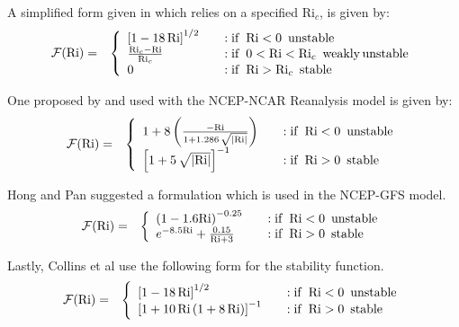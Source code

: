 A simplified form given in \cite{Jacobson2005,Stull1988} which relies on a specified $\mathrm{Ri}_c$, is given by:
\begin{eqnarray}\label{VarDiff_Eq_F_Stull}
\mathcal{F}(\mathrm{Ri}) &=& \left\{ \begin{array} {l@{\quad \quad}l}
 \left[ 1 -18 \, \mathrm{Ri} \right]^{1/2}           &: \mathrm{if}\,\,\, \mathrm{Ri} < 0 \,\,\, \mathrm{unstable} \\
 \frac{\mathrm{Ri}_c-\mathrm{Ri}}{\mathrm{Ri}_c}     &: \mathrm{if}\,\,\, 0<\mathrm{Ri} < \mathrm{Ri}_c\,\,\, \mathrm{weakly \, unstable} \\
 0                                                   &: \mathrm{if}\,\,\, \mathrm{Ri} > \mathrm{Ri}_c \,\,\, \mathrm{stable}
\end{array}
\right.
\end{eqnarray}

One proposed by \cite{Betts1996} and used with the NCEP-NCAR Reanalysis model is given by:
\begin{eqnarray}\label{VarDiff_Eq_F_Betts}
\mathcal{F}(\mathrm{Ri}) &=& \left\{ \begin{array} {l@{\quad \quad}l}
 1 + 8 \left( \frac{- \mathrm{Ri}}{1+1.286 \, \sqrt{\left| \mathrm{Ri}\right|}} \right)  &: \mathrm{if}\,\,\, \mathrm{Ri} < 0 \,\,\, \mathrm{unstable} \\
 \left[ 1+ 5 \, \sqrt{\left| \mathrm{Ri}\right|} \right]^{-1}                            &: \mathrm{if}\,\,\, \mathrm{Ri} > 0 \,\,\, \mathrm{stable}
\end{array}
\right.
\end{eqnarray}

Hong and Pan \cite{Hong1996} suggested a formulation which is used in the NCEP-GFS model.
\begin{eqnarray}\label{VarDiff_Eq_F_Hong}
\mathcal{F}(\mathrm{Ri}) &=& \left\{ \begin{array} {l@{\quad \quad}l}
 \left(1 -1.6 \mathrm{Ri} \right)^{-0.25}                  &: \mathrm{if}\,\,\, \mathrm{Ri} < 0 \,\,\, \mathrm{unstable} \\
 e^{-8.5 \mathrm{Ri}} + \frac{0.15}{\mathrm{Ri} + 3}       &: \mathrm{if}\,\,\, \mathrm{Ri} > 0 \,\,\, \mathrm{stable}
\end{array}
\right.
\end{eqnarray}

Lastly, Collins et al \cite{Collins2004} use the following form for the stability function.
\begin{eqnarray}\label{VarDiff_Eq_F_Collins}
\mathcal{F}(\mathrm{Ri}) &=& \left\{ \begin{array} {l@{\quad \quad}l}
 \left[ 1 -18 \, \mathrm{Ri} \right]^{1/2}                         &: \mathrm{if}\,\,\, \mathrm{Ri} < 0 \,\,\, \mathrm{unstable} \\
 \left[ 1+ 10 \, \mathrm{Ri} \, (1+8 \, \mathrm{Ri}) \right]^{-1}  &: \mathrm{if}\,\,\, \mathrm{Ri} > 0 \,\,\, \mathrm{stable}
\end{array}
\right.
\end{eqnarray}

